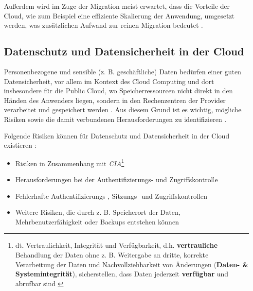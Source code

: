 Außerdem wird im Zuge der Migration meist erwartet, dass die Vorteile der Cloud, wie zum Beispiel eine effiziente Skalierung der Anwendung, umgesetzt werden, was zusätzlichen Aufwand zur reinen Migration bedeutet \cite[Vgl.][]{Ibryam2021}. \pagebreak

\subsection{Datenschutz und Datensicherheit in der Cloud}
Personenbezogene und sensible (z. B. geschäftliche) Daten bedürfen einer guten Datensicherheit, vor allem im Kontext des Cloud Computing und dort insbesondere für die Public Cloud, wo Speicherressourcen nicht direkt in den Händen des Anwenders liegen, sondern in den Rechenzentren der Provider verarbeitet und gespeichert werden \cite[Vgl.][S. 1ff]{Sun2019}. Aus diesem Grund ist es wichtig, mögliche Risiken sowie die damit verbundenen Herausforderungen zu identifizieren \cite[Vgl.][S. 3]{Sun2019}.

Folgende Risiken können für Datenschutz und Datensicherheit in der Cloud existieren \cite[Vgl. auch im folgenden][S. 694]{Kumar2018}:

\begin{itemize}
    \item Risiken in Zusammenhang mit \textit{\ac{CIA}}\footnote{dt. Vertraulichkeit, Integrität und Verfügbarkeit, d.h. \textbf{vertrauliche} Behandlung der Daten ohne z. B. Weitergabe an dritte, korrekte Verarbeitung der Daten und Nachvollziehbarkeit von Änderungen (\textbf{Daten- \& Systemintegrität}), sicherstellen, dass Daten jederzeit \textbf{verfügbar} und abrufbar sind \cite[Vgl.][]{ItServiceNetwork}}
    \item Herausforderungen bei der Authentifizierungs- und Zugriffskontrolle
    \item Fehlerhafte Authentifizierungs-, Sitzungs- und Zugriffskontrollen
    \item Weitere Risiken, die durch z. B. Speicherort der Daten, Mehrbenutzerfähigkeit oder Backups entstehen können
\end{itemize}

\pagebreak